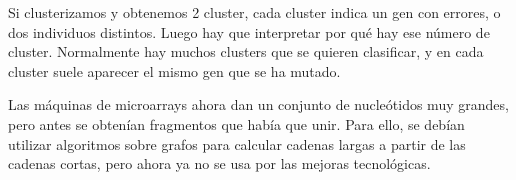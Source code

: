 Si clusterizamos y obtenemos 2 cluster, cada cluster indica un gen con errores, o dos individuos distintos. Luego hay que interpretar por qué hay ese número de cluster. Normalmente hay muchos clusters que se quieren clasificar, y en cada cluster suele aparecer el mismo gen que se ha mutado. 

Las máquinas de microarrays ahora dan un conjunto de nucleótidos muy grandes, pero antes se obtenían fragmentos que había que unir. Para ello, se debían utilizar algoritmos sobre grafos para calcular cadenas largas a partir de las cadenas cortas, pero ahora ya no se usa por las mejoras tecnológicas. 
